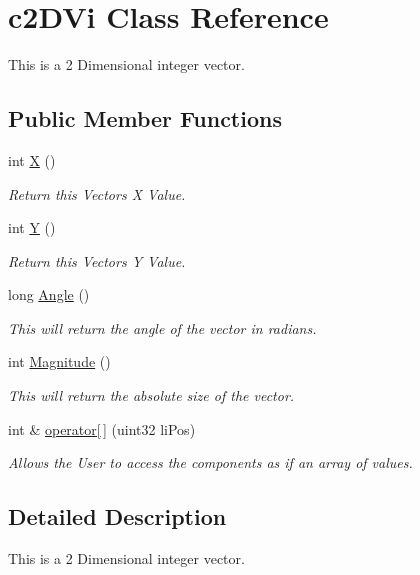 \hypertarget{classc2_d_vi}{
\section{c2DVi Class Reference}
\label{classc2_d_vi}
}


This is a 2 Dimensional integer vector.  


\subsection*{Public Member Functions}
\begin{DoxyCompactItemize}
\item 
\hypertarget{classc2_d_vi_a235048533892baa382d6712e9cd1a884}{
int \hyperlink{classc2_d_vi_a235048533892baa382d6712e9cd1a884}{X} ()}
\label{classc2_d_vi_a235048533892baa382d6712e9cd1a884}

\begin{DoxyCompactList}\small\item\em Return this Vectors X Value. \end{DoxyCompactList}\item 
\hypertarget{classc2_d_vi_ab02af11f026bf14bcfcc9febbc039ecb}{
int \hyperlink{classc2_d_vi_ab02af11f026bf14bcfcc9febbc039ecb}{Y} ()}
\label{classc2_d_vi_ab02af11f026bf14bcfcc9febbc039ecb}

\begin{DoxyCompactList}\small\item\em Return this Vectors Y Value. \end{DoxyCompactList}\item 
\hypertarget{classc2_d_vi_ae9dc5cc90d02c23b83db88c3c7067cb6}{
long \hyperlink{classc2_d_vi_ae9dc5cc90d02c23b83db88c3c7067cb6}{Angle} ()}
\label{classc2_d_vi_ae9dc5cc90d02c23b83db88c3c7067cb6}

\begin{DoxyCompactList}\small\item\em This will return the angle of the vector in radians. \end{DoxyCompactList}\item 
\hypertarget{classc2_d_vi_a308f02ff176570f09b80fc2894f9a141}{
int \hyperlink{classc2_d_vi_a308f02ff176570f09b80fc2894f9a141}{Magnitude} ()}
\label{classc2_d_vi_a308f02ff176570f09b80fc2894f9a141}

\begin{DoxyCompactList}\small\item\em This will return the absolute size of the vector. \end{DoxyCompactList}\item 
\hypertarget{classc2_d_vi_a30257e338c34766b01a817e1af92fb78}{
int \& \hyperlink{classc2_d_vi_a30257e338c34766b01a817e1af92fb78}{operator\mbox{[}$\,$\mbox{]}} (uint32 liPos)}
\label{classc2_d_vi_a30257e338c34766b01a817e1af92fb78}

\begin{DoxyCompactList}\small\item\em Allows the User to access the components as if an array of values. \end{DoxyCompactList}\end{DoxyCompactItemize}


\subsection{Detailed Description}
This is a 2 Dimensional integer vector. 